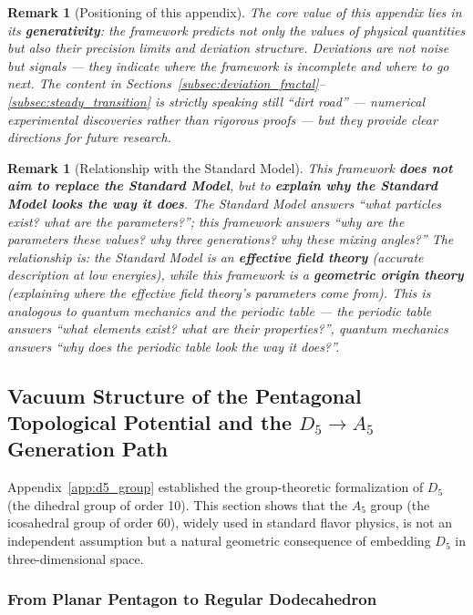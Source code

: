 \documentclass[12pt,a4paper,twocolumn]{article}
\newtheorem{remark}[theorem]{Remark}
\begin{document}
\begin{remark}[Positioning of this appendix]
The core value of this appendix lies in its \textbf{generativity}: the framework predicts not only the values of physical quantities but also their precision limits and deviation structure. Deviations are not noise but signals --- they indicate where the framework is incomplete and where to go next. The content in Sections~\ref{subsec:deviation_fractal}--\ref{subsec:steady_transition} is strictly speaking still ``dirt road'' --- numerical experimental discoveries rather than rigorous proofs --- but they provide clear directions for future research.
\end{remark}

\begin{remark}[Relationship with the Standard Model]
\label{rmk:sm_relation_en}
This framework \textbf{does not aim to replace the Standard Model}, but to \textbf{explain why the Standard Model looks the way it does}. The Standard Model answers ``what particles exist? what are the parameters?''; this framework answers ``why are the parameters these values? why three generations? why these mixing angles?'' The relationship is: the Standard Model is an \textbf{effective field theory} (accurate description at low energies), while this framework is a \textbf{geometric origin theory} (explaining where the effective field theory's parameters come from). This is analogous to quantum mechanics and the periodic table --- the periodic table answers ``what elements exist? what are their properties?'', quantum mechanics answers ``why does the periodic table look the way it does?''.
\end{remark}

\subsection{Vacuum Structure of the Pentagonal Topological Potential and the $D_5 \to A_5$ Generation Path}
\label{subsec:d5_a5_path}

Appendix~\ref{app:d5_group} established the group-theoretic formalization of $D_5$ (the dihedral group of order 10). This section shows that the $A_5$ group (the icosahedral group of order 60), widely used in standard flavor physics, is not an independent assumption but a natural geometric consequence of embedding $D_5$ in three-dimensional space.

\subsubsection{From Planar Pentagon to Regular Dodecahedron}
\end{document}
